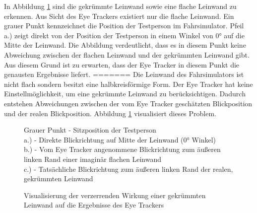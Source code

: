 In Abbildung \ref{fig:kruemmungsproblem_1} sind die gekrümmte Leinwand sowie eine flache Leinwand zu erkennen. Aus Sicht des Eye Trackers existiert nur die flache Leinwand. Ein grauer Punkt kennzeichnet die Position der Testperson im Fahrsimulator. Pfeil a.) zeigt direkt von der Position der Testperson in einem Winkel von 0° auf die Mitte der Leinwand. Die Abbildung verdeutlicht, dass es in diesem Punkt keine Abweichung zwischen der flachen Leinwand und der gekrümmten Leinwand gibt. Aus diesem Grund ist zu erwarten, dass der Eye Tracker in diesem Punkt die genausten Ergebnisse liefert. 
=======
Die Leinwand des Fahrsimulators ist nicht flach sondern besitzt eine halbkreisförmige Form. Der Eye Tracker hat keine Einstellmöglichkeit, um eine gekrümmte Leinwand zu berücksichtigen. Dadurch entstehen Abweichungen zwischen der vom Eye Tracker geschätzten Blickposition und der realen Blickposition. Abbildung \ref{fig:kruemmungsproblem_1} visualisiert dieses Problem. 



\begin{figure}
	\begin{center}
		\caption[]
		{Visualisierung der verzerrenden Wirkung einer gekrümmten Leinwand auf die Ergebnisse des Eye Trackers}
		\captionsetup{justification=justified, singlelinecheck=false}
		{\footnotesize Grauer Punkt - Sitzposition der Testperson\\
		a.) - Direkte Blickrichtung auf Mitte der Leinwand (0° Winkel)\\
		b.) - Vom Eye Tracker angenommene Blickrichtung zum äußeren linken Rand einer imaginär flachen Leinwand\\
		c.) - Tatsächliche Blickrichtung zum äußeren linken Rand der realen, gekrümmten Leinwand
		}
		 \label{fig:kruemmungsproblem_1}
	\end{center}
\end{figure}

